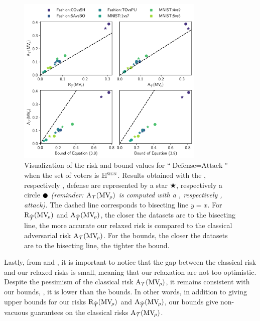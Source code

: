 \begin{figure}
    \centering
    \includegraphics[width=0.8\textwidth]{chapter_3/figures/plot.pdf}
    \caption[Visualization of the risk and bound values for ``$\text{Defense}{=}\text{Attack}$'']{
    Visualization of the risk and bound values for ``$\text{Defense}{=}\text{Attack}$'' when the set of voters is $\mathbb{H}^{\text{{\sc sign}}}$.
   Results obtained with the \PGDU, respectively \IFGSMU, defense are represented by a star $\bigstar$, respectively a circle $\newmoon$ 
   {\it   (reminder: $\text{A}_{\mathcal{T}}(\text{MV}_{\!\rho})$ is computed with a \PGD, respectively \IFGSM, attack).}
   The dashed line corresponds to bisecting line $y{=}x$. 
    For $\text{R}_{\widehat{\mathcal{T}}}(\text{MV}_{\!\rho})$ and $\text{A}_{\widehat{\mathcal{T}}}(\text{MV}_{\!\rho})$, the closer the datasets are to the bisecting line, the more accurate our relaxed risk is compared to the classical adversarial risk $\text{A}_{\mathcal{T}}(\text{MV}_{\!\rho})$.
    For the bounds, the closer the datasets are to the bisecting line, the tighter the bound.
   }
    \label{chap:mv-robustness:fig:summarized-results}
\end{figure}

Lastly, from  and , it is important to notice that the gap between the classical risk and our relaxed risks is small, meaning that our relaxation are not too optimistic.
Despite the pessimism of the classical risk $\text{A}_{\mathcal{T}}(\text{MV}_{\!\rho})$, it remains consistent with our bounds, \ie, it is lower than the bounds.
In other words, in addition to giving upper bounds for our risks $\text{R}_{\widehat{\mathcal{T}}}(\text{MV}_{\!\rho})$ and $\text{A}_{\widehat{\mathcal{T}}}(\text{MV}_{\!\rho})$, our bounds give non-vacuous guarantees on  the classical risks $\text{A}_{\mathcal{T}}(\text{MV}_{\!\rho})$.

